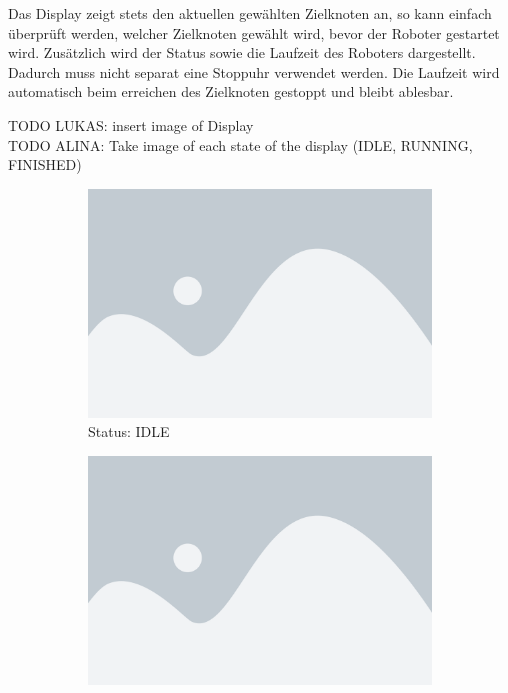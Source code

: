 Das Display zeigt stets den aktuellen gewählten Zielknoten an, so kann einfach überprüft werden, welcher Zielknoten gewählt wird, bevor der Roboter gestartet wird. 
Zusätzlich wird der Status sowie die Laufzeit des Roboters dargestellt. Dadurch muss nicht separat eine Stoppuhr verwendet werden. Die Laufzeit wird automatisch beim erreichen des Zielknoten gestoppt und bleibt ablesbar.

TODO LUKAS: insert image of Display\\
TODO ALINA: Take image of each state of the display (IDLE, RUNNING, FINISHED)

\begin{figure}[H]
    \centering
    \begin{subfigure}[t]{0.30\textwidth}
        \includegraphics[width=\linewidth]{assets/placeholder.png}
    \caption*{Status: IDLE}
    \end{subfigure}
    \hfill
    \begin{subfigure}[t]{0.30\textwidth}
        \includegraphics[width=\linewidth]{assets/placeholder.png}

\end{subfigure}
\end{figure}

